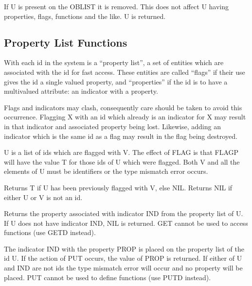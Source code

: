 \documentclass[11pt,letterpaper]{book}
\begin{document}
{If U is present on the OBLIST it is removed. This does not affect U
having properties, flags, functions and the like. U is returned.}


\subsection{Property List Functions}
\label{plist}
With each id in the system is a ``property list'', a set of entities
which are associated with the id for fast access. These entities are
called ``flags'' if their use gives the id a single valued
property, and ``properties'' if the id is to have a multivalued
attribute: an indicator with a property.

Flags and indicators may clash, consequently care should be taken to
avoid this occurrence. Flagging X with an id which already is an
indicator for X may result in that indicator and associated property
being lost. Likewise, adding an indicator which is the same id as a
flag may result in the flag being destroyed.



{U is a list of ids which are flagged with V. The effect of FLAG is
that FLAGP will have the value T for those ids of U which were
flagged. Both V and all the elements of U must be identifiers or the
type mismatch error occurs.}


{Returns T if U has been previously flagged with V, else NIL. Returns
NIL if either U or V is not an id.}


{Returns the property associated with indicator IND from the property
list of U. If U does not have indicator IND, NIL is returned. GET
cannot be used to access functions (use GETD instead).
}


{The indicator IND with the property PROP is placed on the property
list of the id U. If the action of PUT occurs, the value of PROP is
returned. If either of U and IND are not ids the type mismatch error
will occur and no property will be placed. PUT cannot be used to
define functions (use PUTD instead).
}
\end{document}
